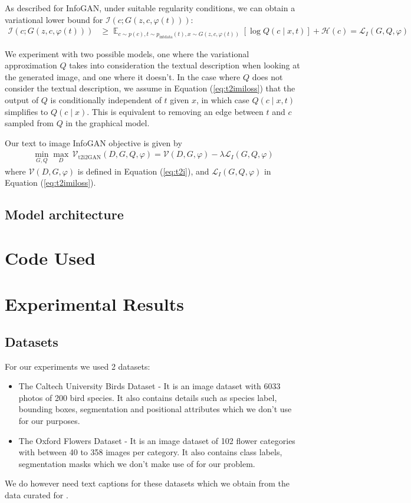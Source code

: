 \documentclass{article}
\DeclareMathOperator*{\E}{\mathbb{E}}
\let\cite=\supercite
\begin{document}
As described for InfoGAN, under suitable regularity conditions, we can obtain a variational lower bound for $\mathcal{I}(c;G(z,c,\varphi(t)))$:
\begin{align}
\mathcal{I}(c;G(z,c, \varphi(t))) &\geq \E_{c\sim p(c), t\sim p_{\text{intdata}}(t), x\sim G(z,c, \varphi(t))}\left[\log Q(c\mid x,t)\right] + \mathcal{H}(c) = \mathcal{L}_I(G,Q,\varphi) \label{eq:t2imiloss}
\end{align}

We experiment with two possible models, one where the variational approximation $Q$ takes into consideration the textual description when looking at the generated image, and one where it doesn't. In the case where $Q$ does not consider the textual description, we assume in Equation (\ref{eq:t2imiloss}) that the output of $Q$ is conditionally independent of $t$ given $x$, in which case $Q(c\mid x,t)$ simplifies to $Q(c\mid x)$. This is equivalent to removing an edge between $t$ and $c$ sampled from $Q$ in the graphical model.

Our text to image InfoGAN objective is given by
\begin{align}
\min_{G,Q} \max_D\, \mathcal{V}_{\text{t2i2GAN}}(D,G,Q,\varphi) = \mathcal{V}(D,G,\varphi) - \lambda \mathcal{L}_I(G,Q,\varphi)
\end{align}
where $\mathcal{V}(D,G,\varphi)$ is defined in Equation (\ref{eq:t2i}), and $\mathcal{L}_I(G,Q,\varphi)$ in Equation (\ref{eq:t2imiloss}).


\subsection{Model architecture}





\section{Code Used}

\section{Experimental Results}
\subsection{Datasets}
For our experiments we used 2 datasets: 
\begin{itemize}
    \item The Caltech University Birds Dataset \cite{cub} - It is an image
        dataset with 6033 photos of 200 bird species. It also contains details
        such as species label, bounding boxes, segmentation and positional
        attributes which we don't use for our purposes.
    \item The Oxford Flowers Dataset \cite{flowers} - It is an image dataset of
        102 flower categories with between 40 to 358 images per category. It
        also contains class labels, segmentation masks which we don't make use
        of for our problem.
\end{itemize}
We do however need text captions for these datasets which we obtain from the data
curated for \cite{visualdesc}.
\end{document}
